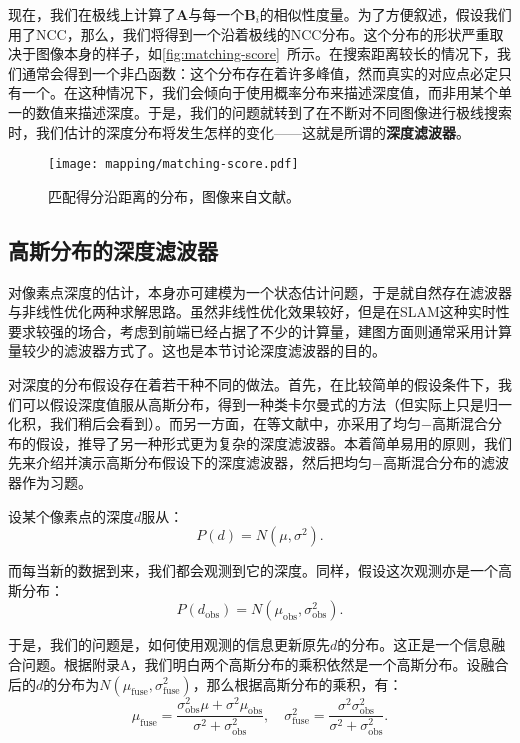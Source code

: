 现在，我们在极线上计算了$\bm{A}$与每一个$\bm{B}_i$的相似性度量。为了方便叙述，假设我们用了NCC，那么，我们将得到一个沿着极线的NCC分布。这个分布的形状严重取决于图像本身的样子，如\autoref{fig:matching-score}~所示。在搜索距离较长的情况下，我们通常会得到一个非凸函数：这个分布存在着许多峰值，然而真实的对应点必定只有一个。在这种情况下，我们会倾向于使用概率分布来描述深度值，而非用某个单一的数值来描述深度。于是，我们的问题就转到了在不断对不同图像进行极线搜索时，我们估计的深度分布将发生怎样的变化——这就是所谓的\textbf{深度滤波器}。

\begin{figure}[!htp]
	\centering
	\texttt{[image: mapping/matching-score.pdf]}
	\caption{匹配得分沿距离的分布，图像来自文献\cite{Vogiatzis2011}。}
	\label{fig:matching-score}
\end{figure}

\subsection{高斯分布的深度滤波器}
对像素点深度的估计，本身亦可建模为一个状态估计问题，于是就自然存在滤波器与非线性优化两种求解思路。虽然非线性优化效果较好，但是在SLAM这种实时性要求较强的场合，考虑到前端已经占据了不少的计算量，建图方面则通常采用计算量较少的滤波器方式了。这也是本节讨论深度滤波器的目的。

对深度的分布假设存在着若干种不同的做法。首先，在比较简单的假设条件下，我们可以假设深度值服从高斯分布，得到一种类卡尔曼式的方法（但实际上只是归一化积，我们稍后会看到）。而另一方面，在\cite{Vogiatzis2011, Forster2014}等文献中，亦采用了均匀−高斯混合分布的假设，推导了另一种形式更为复杂的深度滤波器。本着简单易用的原则，我们先来介绍并演示高斯分布假设下的深度滤波器，然后把均匀−高斯混合分布的滤波器作为习题。

设某个像素点的深度$d$服从：
\begin{equation}
P(d) = N(\mu, \sigma^2).
\end{equation}

而每当新的数据到来，我们都会观测到它的深度。同样，假设这次观测亦是一个高斯分布：
\begin{equation}
P(d_{\mathrm{obs}}) = N(\mu_{\mathrm{obs}}, \sigma_{\mathrm{obs}}^2 ).
\end{equation}

于是，我们的问题是，如何使用观测的信息更新原先$d$的分布。这正是一个信息融合问题。根据附录A，我们明白两个高斯分布的乘积依然是一个高斯分布。设融合后的$d$的分布为$N(\mu_{\mathrm{fuse}}, \sigma_{\mathrm{fuse}}^2)$，那么根据高斯分布的乘积，有：
\begin{equation}
{\mu _{\mathrm{fuse}}} = \frac{{\sigma _{\mathrm{obs}}^2\mu  + {\sigma ^2}{\mu _{\mathrm{obs}}}}}{{{\sigma ^2} + \sigma _{\mathrm{obs}}^2}},\quad \sigma _{\mathrm{fuse}}^2 = \frac{{{\sigma ^2}\sigma _{\mathrm{obs}}^2}}{{{\sigma ^2} + \sigma _{\mathrm{obs}}^2}}.
\end{equation}


